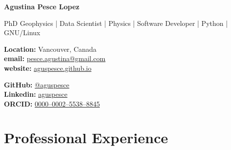 \documentclass[10pt, a4paper]{article}
\makeatletter
\newcommand{\firstname}{Agustina}
\newcommand{\familyname}{Pesce Lopez}
\newcommand{\email}{pesce.agustina@gmail.com}
\newcommand{\website}{aguspesce.github.io}
\newcommand{\github}{aguspesce}
\newcommand{\linkedin}{aguspesce}
\newcommand{\orcid}{0000--0002--5538--8845}
\newcommand{\fullname}{\firstname{} \familyname}
\newcommand{\maintitle}[1]{
    \begin{center}
        \textbf{\Huge #1}
    \end{center}
}
\newcommand{\subtitle}[1]{
    \begin{center}
        {\large #1}
    \end{center}
}
\newcommand{\affiliation}[1]{
    \begin{center}
        {#1}
    \end{center}
}
\newcommand{\entriespad}{0.75em}
\newcommand{\MAIL}[1]{\href{mailto:#1}{#1}}
\newcommand{\GITHUB}[1]{\href{https://github.com/#1}{@#1}}
\newcommand{\ORCID}[1]{\href{https://orcid.org/#1}{#1}}
\newcommand{\WEBSITE}[1]{\href{https://#1}{#1}}
\newcommand{\LINKEDIN}[1]{\href{https://linkedin.com/in/#1}{#1}}
\makeatother
\begin{document}
\maintitle{\fullname}
\subtitle{
    PhD Geophysics | Data Scientist | Physics | Software Developer | Python
    | GNU/Linux
}
\vspace{\entriespad}

\begin{minipage}[t]{0.60\linewidth}
    \begin{flushleft}
        \textbf{Location:} Vancouver, Canada
        \\
        \textbf{email:} \MAIL{\email}
        \\
        \textbf{website:} \WEBSITE{\website}
    \end{flushleft}
\end{minipage}
\hfill
\begin{minipage}[t]{0.40\linewidth}
    \begin{flushright}
        \textbf{GitHub:} \GITHUB{\github}
        \\
        \textbf{Linkedin:} \LINKEDIN{\linkedin}
        \\
        \textbf{ORCID:} \ORCID{\orcid}
    \end{flushright}
\end{minipage}

\vspace{\entriespad}

\vspace{\entriespad}

\section{Professional Experience}
\end{document}
